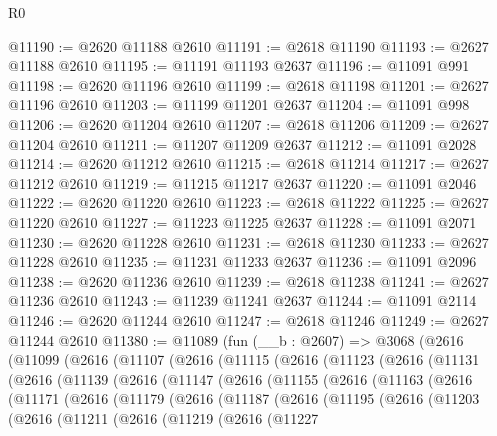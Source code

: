 \begin{lexlean}{R0}
\begin{coremodule}
@11190 := @2620 @11188 @2610
@11191 := @2618 @11190
@11193 := @2627 @11188 @2610
@11195 := @11191 @11193 @2637
@11196 := @11091 @991
@11198 := @2620 @11196 @2610
@11199 := @2618 @11198
@11201 := @2627 @11196 @2610
@11203 := @11199 @11201 @2637
@11204 := @11091 @998
@11206 := @2620 @11204 @2610
@11207 := @2618 @11206
@11209 := @2627 @11204 @2610
@11211 := @11207 @11209 @2637
@11212 := @11091 @2028
@11214 := @2620 @11212 @2610
@11215 := @2618 @11214
@11217 := @2627 @11212 @2610
@11219 := @11215 @11217 @2637
@11220 := @11091 @2046
@11222 := @2620 @11220 @2610
@11223 := @2618 @11222
@11225 := @2627 @11220 @2610
@11227 := @11223 @11225 @2637
@11228 := @11091 @2071
@11230 := @2620 @11228 @2610
@11231 := @2618 @11230
@11233 := @2627 @11228 @2610
@11235 := @11231 @11233 @2637
@11236 := @11091 @2096
@11238 := @2620 @11236 @2610
@11239 := @2618 @11238
@11241 := @2627 @11236 @2610
@11243 := @11239 @11241 @2637
@11244 := @11091 @2114
@11246 := @2620 @11244 @2610
@11247 := @2618 @11246
@11249 := @2627 @11244 @2610
@11380 := @11089
    (fun (__b : @2607) =>
    @3068
      (@2616
        (@11099
          (@2616
            (@11107
              (@2616
                (@11115
                  (@2616
                    (@11123
                      (@2616
                        (@11131
                          (@2616
                            (@11139
                              (@2616
                                (@11147
                                  (@2616
                                    (@11155
                                      (@2616
                                        (@11163
                                          (@2616
                                            (@11171
                                              (@2616
                                                (@11179
                                                  (@2616
                                                    (@11187
                                                      (@2616
                                                        (@11195
                                                          (@2616
                                                            (@11203
                                                              (@2616
                                                                (@11211
                                                                  (@2616
                                                                    (@11219
                                                                      (@2616
                                                                        (@11227

\end{coremodule}
\end{lexlean}
